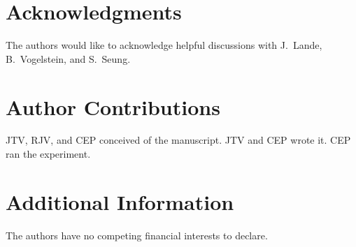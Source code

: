 \documentclass{article}
\begin{document}
% 
% 
% 
% 
% 
% 
% 
% 




\section*{Acknowledgments}

The authors would like to acknowledge helpful discussions with J.~Lande, B.~Vogelstein, and S.~Seung. 

\section*{Author Contributions}

JTV, RJV, and CEP conceived of the manuscript.  JTV and CEP wrote it.  CEP ran the experiment.

\section*{Additional Information}

The authors have no competing financial interests to declare.
\end{document}
